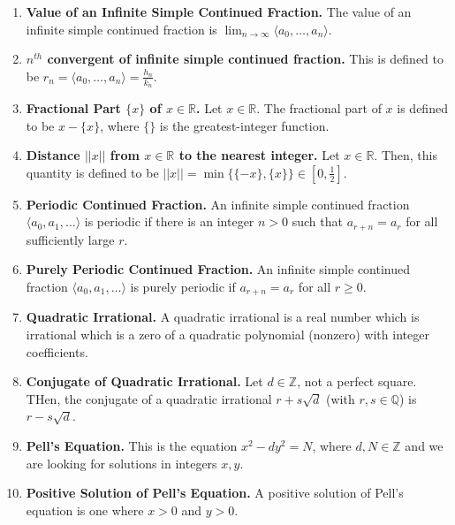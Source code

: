 \documentclass[12pt]{article}
\theoremstyle{definition}
\theoremstyle{named}
\begin{document}
\begin{enumerate}
    \item \textbf{Value of an Infinite Simple Continued Fraction. } The value of an infinite simple continued fraction is $\lim_{n \to \infty} \langle a_0,\dots,a_n \rangle$. 
    \item \textbf{$n^{th}$ convergent of infinite simple continued fraction. } This is defined to be $r_n = \langle a_0,\dots,a_n \rangle = \frac{h_n}{k_n}$. 
    \item \textbf{Fractional Part $\{x\}$ of $x \in \mathbb{R}$. } Let $x \in \mathbb{R}$. The fractional part of $x$ is defined to be $x - \{x\}$, where $\{\}$ is the greatest-integer function. 
    \item \textbf{Distance $||x||$ from $x \in \mathbb{R}$ to the nearest integer. } Let $x \in \mathbb{R}$. Then, this quantity is defined to be $||x|| = \min \{\{-x\}, \{x\}\} \in [0,\frac{1}{2}]$. 
    \item \textbf{Periodic Continued Fraction. } An infinite simple continued fraction $\langle a_0,a_1,\dots \rangle$ is periodic if there is an integer $n>0$ such that $a_{r+n} = a_r$ for all sufficiently large $r$. 
    \item \textbf{Purely Periodic Continued Fraction. } An infinite simple continued fraction $\langle a_0,a_1,\dots \rangle$ is purely periodic if $a_{r+n} = a_r$ for all $r \geq 0$. 
    \item \textbf{Quadratic Irrational. } A quadratic irrational is a real number which is irrational which is a zero of a quadratic polynomial (nonzero) with integer coefficients. 
    \item \textbf{Conjugate of Quadratic Irrational. } Let $d \in \mathbb{Z}$, not a perfect square. THen, the conjugate of a quadratic irrational $r + s\sqrt{d}$ (with $r,s \in \mathbb{Q}$) is $r - s\sqrt{d}$. 
    \item \textbf{Pell's Equation. } This is the equation $x^2 - dy^2 = N$, where $d,N \in \mathbb{Z}$ and we are looking for solutions in integers $x,y$. 
    \item \textbf{Positive Solution of Pell's Equation. } A positive solution of Pell's equation is one where $x>0$ and $y>0$. 
\end{enumerate}
\end{document}
